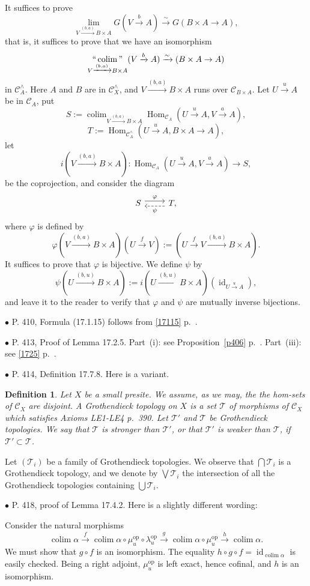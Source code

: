 \documentclass[12pt]{article}
\newtheorem{df}[thm]{Definition}%
\theoremstyle{remark}%
\newcommand{\bu}{\bullet}
\newcommand{\n}{\noindent}
\newcommand{\cc}{\mathcal}
\newcommand{\C}{\mathcal C}
\newcommand{\p}{\varphi}
\newcommand{\xr}{\xrightarrow}
\DeclareMathOperator*{\coli}{colim}
\DeclareMathOperator*{\co}{colim}
\DeclareMathOperator*{\ic}{``\coli"}
\DeclareMathOperator{\id}{id}
\DeclareMathOperator{\h}{Hom}
\DeclareMathOperator{\op}{op}
\begin{document}
It suffices to prove 
$$
\lim_{V\xr{(b,a)}B\times A}G(V\xr b A)\xr\sim G(B\times A\to A),
$$
that is, it suffices to prove that we have an isomorphism 
$$
\ic_{V\xr{(b,a)}B\times A}(V\xr b A)\xr\sim(B\times A\to A)
$$ 
in $\C_A^\wedge$. Here $A$ and $B$ are in $\C_X^\wedge$, and $V\xr{(b,a)}B\times A$ runs over $\C_{B\times A}$. Let $U\xr u A$ be in $\C_A$, put 
$$
S:=\displaystyle\co_{V\xr{(b,a)}B\times A}\h_{\C_A}(U\xr u A,V\xr a A),
$$ 
$$
T:=\h_{\C_A^\wedge}(U\xr u A,B\times A\to A),
$$ 
let 
$$
i(V\xr{(b,a)}B\times A):\h_{\C_A}(U\xr u A,V\xr a A)\to S,
$$ 
be the coprojection, and consider the diagram 
$$
\begin{tikzcd}
%
S\ar[yshift=.7ex]{r}{\p}&T,\ar[yshift=-.7ex,dashed]{l}{\psi}
%
\end{tikzcd}
$$ 
where $\p$ is defined by 
$$
\p(V\xr{(b,a)}B\times A)(U\xr fV):=(U\xr fV\xr{(b,a)}B\times A).
$$
It suffices to prove that $\p$ is bijective. We define $\psi$ by 
$$
\psi(U\xr{(b,u)}B\times A):=i(U\xr{(b,u)}B\times A)(\id_{U\xr uA}),
$$ 
and leave it to the reader to verify that $\p$ and $\psi$ are mutually inverse bijections.


\n$\bu$ P. 410, Formula (17.1.15) follows from \eqref{17115} p.~\pageref{17115}.


\n$\bu$ P. 413, Proof of Lemma 17.2.5. Part~(i): see Proposition~\ref{p406} p.~\pageref{p406}. Part~(iii): see \eqref{1725} p.~\pageref{1725}.


\n$\bu$ P. 414, Definition 17.7.8. Here is a variant. 
%
\begin{df}\label{1778}
Let $X$ be a small presite. We assume, as we may, the the hom-sets of $\C_X$ are disjoint. A {\em Grothendieck topology} on $X$ is a set $\cc T$ of morphisms of $\C_X$ which satisfies Axioms LE1-LE4 p.~390. Let $\cc T'$ and $\cc T$ be Grothendieck topologies. We say that $\cc T$ is {\em stronger than} $\cc T'$, or that $\cc T'$ is {\em weaker than} $\cc T$, if $\cc T'\subset\cc T$. 
\end{df}
%
Let $(\cc T_i)$ be a family of Grothendieck topologies. We observe that $\bigcap\cc T_i$ is a Grothendieck topology, and we denote by $\bigvee\cc T_i$ the intersection of all the Grothendieck topologies containing $\bigcup\cc T_i$.


\n$\bu$ P. 418, proof of Lemma 17.4.2. Here is a slightly different wording: 

Consider the natural morphisms 
$$
\co\alpha\xr f\co\alpha\circ\mu_u^{\op}\circ\lambda_u^{\op}\xr g\co\alpha\circ\mu_u^{\op}\xr h\co\alpha.
$$
We must show that $g\circ f$ is an isomorphism. The equality $h\circ g\circ f=\id_{\co\alpha}$ is easily checked. Being a right adjoint, $\mu_u^{\op}$ is left exact, hence cofinal, and $h$ is an isomorphism.
\end{document}
